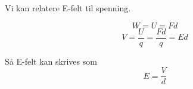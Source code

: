 Vi kan relatere E-felt til spenning.

$$W = U = F d$$
$$V = \frac{U}{q}
    = \frac{F d}{q}
    = E d$$

Så E-felt kan skrives som
$$E = \frac{V}{d}$$
